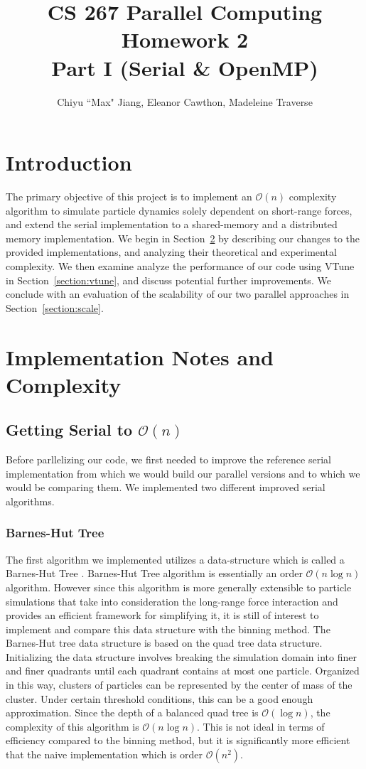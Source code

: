 \documentclass{article}
\title{CS 267 Parallel Computing Homework 2\\
\large{Part I (Serial \& OpenMP)}}
\author{Chiyu ``Max" Jiang, Eleanor Cawthon, Madeleine Traverse}
\begin{document}
\maketitle
\section{Introduction}
The primary objective of this project is to implement an $\mathcal{O}(n)$
complexity algorithm to simulate particle dynamics solely dependent on
short-range forces, and extend the serial implementation to a shared-memory
and a distributed memory implementation. We begin in
Section~\ref{section:impl} by describing our changes to the provided
implementations, and analyzing their theoretical and experimental complexity. We
then examine analyze the performance of our code using VTune in
Section~\ref{section:vtune}, and discuss potential further improvements.  We
conclude with an evaluation of the scalability of our two parallel approaches in
Section~\ref{section:scale}.
\section{Implementation Notes and Complexity}\label{section:impl}
\subsection{Getting Serial to $\mathcal{O}(n)$}\label{subection:serial}
Before parllelizing our code, we first needed to improve the reference serial
implementation from which we would build our parallel versions and to which we
would be comparing them. We implemented two different improved serial
algorithms.
\subsubsection{Barnes-Hut Tree}
The first algorithm we implemented utilizes a data-structure which is
called a Barnes-Hut Tree \cite{barnes1986hierarchical}.
Barnes-Hut Tree algorithm is essentially an order $\mathcal{O}(n\log n)$
algorithm. However since this algorithm is more generally extensible to particle
simulations that take into consideration the long-range force interaction and
provides an efficient framework for simplifying it, it is still of interest to
implement and compare this data structure with the binning method. The
Barnes-Hut tree data structure is based on the quad tree data structure.
Initializing the data structure involves breaking the simulation domain
into finer and finer quadrants until each quadrant contains at most one
particle. Organized in this way, clusters of particles can be represented by the
center of mass of the cluster. Under certain threshold conditions, this can
be a good enough approximation.  Since the depth of a balanced quad tree is
$\mathcal{O}(\log n)$, the complexity of this algorithm is $\mathcal{O}(n\log
n)$. This is not ideal in terms of efficiency compared to the binning method,
but it is significantly more efficient that the naive implementation which is
order $\mathcal{O}(n^2)$.
\end{document}
